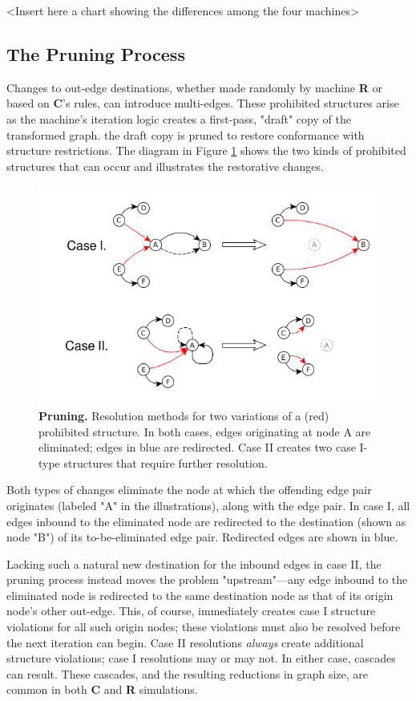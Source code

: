 \documentclass{tufte-handout}
\begin{document}
<Insert here a chart showing the differences among the four machines>

\subsection{The Pruning Process}

Changes to out-edge destinations, whether made randomly by machine \textbf{R} or based on \textbf{C}'s
rules, can introduce multi-edges. These prohibited structures
arise as the machine's iteration logic creates a first-pass, "draft" copy of the transformed graph.
the draft copy is pruned to restore conformance with structure restrictions.
The diagram in Figure \ref{fig:Pruning} shows the two kinds of prohibited structures
that can occur and illustrates the restorative changes.

\begin{figure}
\includegraphics{pruning.png}
\caption{\textbf{Pruning.} Resolution methods for two variations of a (red) prohibited structure.
In both cases, edges originating at node A are eliminated; edges in blue are redirected.
Case II creates two case I-type structures that require further resolution.}
\label{fig:Pruning}
\end{figure}

Both types of changes eliminate the node at which the offending edge pair
originates (labeled "A" in the illustrations), along with the edge pair.
In case I, all edges inbound to the eliminated node are redirected to 
the destination (shown as node "B") of its to-be-eliminated edge pair.
Redirected edges are shown in blue.

Lacking such a natural new destination for the inbound edges in case II, the
pruning process instead moves the problem "upstream"---any edge inbound to
the eliminated node is redirected to the same destination node as that of
its origin node's other out-edge. This, of course, immediately creates
case I structure violations for all such origin nodes; these violations must also be
resolved before the next iteration can begin.
Case II resolutions \textit{always} create additional structure violations;
case I resolutions may or may not. In either case, cascades can result. These
cascades, and the resulting reductions in graph size, are common in both
\textbf{C} and \textbf{R} simulations.
\end{document}
